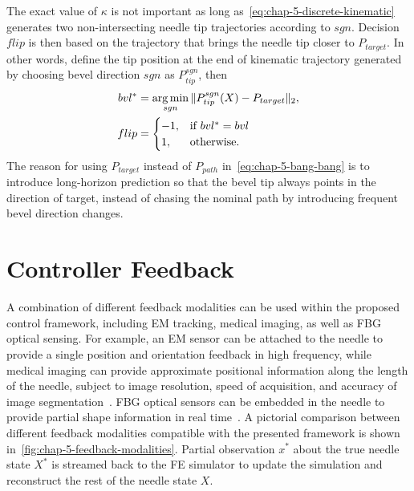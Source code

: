 The exact value of $\kappa$ is not important as long as~\cref{eq:chap-5-discrete-kinematic} generates two non-intersecting needle tip trajectories according to $sgn$. Decision $flip$ is then based on the trajectory that brings the needle tip closer to $P_{target}$. In other words, define the tip position at the end of kinematic trajectory generated by choosing bevel direction $sgn$ as $P_{tip}^{sgn}$, then
\begin{align}
  \label{eq:chap-5-bang-bang}
  bvl^{*} &= \operatorname*{arg\,min}_{sgn} \Vert P_{tip}^{sgn}(X) - P_{target} \Vert_2, \\
  flip &= \begin{cases}
     -1, & \text{if } bvl^{*} = bvl \\
     1, & \text{otherwise.}
  \end{cases}
\end{align}
The reason for using $P_{target}$ instead of $P_{path}$ in~\cref{eq:chap-5-bang-bang} is to introduce long-horizon prediction so that the bevel tip always points in the direction of target, instead of chasing the nominal path by introducing frequent bevel direction changes.

\section{Controller Feedback}
\label{sec:chap-5-controller-feedback}

A combination of different feedback modalities can be used within the proposed control framework, including EM tracking, medical imaging, as well as FBG optical sensing. For example, an EM sensor can be attached to the needle to provide a single position and orientation feedback in high frequency, while medical imaging can provide approximate positional information along the length of the needle, subject to image resolution, speed of acquisition, and accuracy of image segmentation~\parencite{glozmanImageGuidedRoboticFlexible2007}. FBG optical sensors can be embedded in the needle to provide partial shape information in real time~\parencite{wangSimulationbasedFlexibleNeedle2024}. A pictorial comparison between different feedback modalities compatible with the presented framework is shown in~\cref{fig:chap-5-feedback-modalities}. Partial observation $x^{*}$ about the true needle state $X^{*}$ is streamed back to the FE simulator to update the simulation and reconstruct the rest of the needle state $X$.

